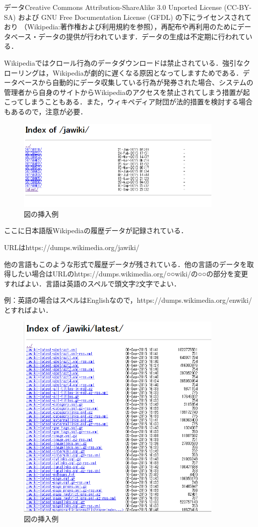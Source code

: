 データCreative Commons Attribution-ShareAlike 3.0 Unported License (CC-BY-SA) および GNU Free Documentation License (GFDL) の下にライセンスされており （Wikipedia:著作権および利用規約を参照），再配布や再利用のためにデータベース・データの提供が行われています．データの生成は不定期に行われている．

Wikipediaではクロール行為のデータダウンロードは禁止されている．強引なクローリングは，Wikipediaが劇的に遅くなる原因となってしますためである．データベースから自動的にデータ収集している行為が発券された場合、システムの管理者から自身のサイトからWikipediaのアクセスを禁止されてしまう措置が起こってしまうこともある．また，ウィキペディア財団が法的措置を検討する場合もあるので，注意が必要．

\begin{figure}[htb]
\centering
\includegraphics[width=10cm]{sample4.png}
\caption{図の挿入例}\label{サンプル図}
\end{figure}

ここに日本語版Wikipediaの履歴データが記録されている．

URLはhttps://dumps.wikimedia.org/jawiki/

他の言語もこのような形式で履歴データが残されている．他の言語のデータを取得したい場合はURLのhttps://dumps.wikimedia.org/○○wiki/の○○の部分を変更すればよい．言語は英語のスペルで頭文字2文字でよい．

例：英語の場合はスペルはEnglishなので，https://dumps.wikimedia.org/enwiki/とすればよい．



\begin{figure}[htb]
\centering
\includegraphics[width=10cm]{sample5.png}
\caption{図の挿入例}\label{サンプル図}
\end{figure}

